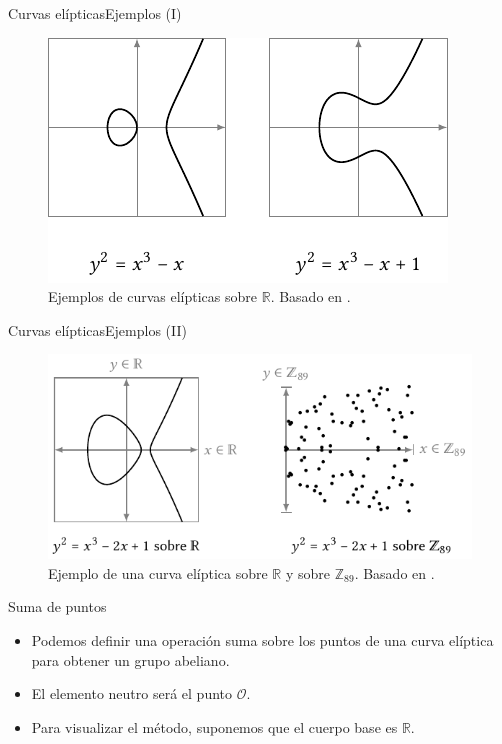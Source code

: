 \documentclass[spanish]{beamer}
\begin{document}
\begin{frame}[fragile]{Curvas elípticas}{Ejemplos (I)}
  \begin{figure}[h]
    \centering
    \includegraphics[width=.75\textwidth]{img/ejemplos-curvas}
    \caption{Ejemplos de curvas elípticas sobre $\mathbb{R}$. Basado en \parencite{eichlseder_elliptic_2016}.}
    \label{fig:curvas}
  \end{figure}
\end{frame}

\begin{frame}[fragile]{Curvas elípticas}{Ejemplos (II)}
  \begin{figure}[h]
    \centering
    \includegraphics[width=.85\textwidth]{img/cuerpos-curvas}
    \caption{Ejemplo de una curva elíptica sobre $\mathbb{R}$ y sobre $\mathbb{Z}_{89}$. Basado en \parencite{eichlseder_elliptic_2016}.}
    \label{fig:curvas-finitos}
  \end{figure}
\end{frame}

\begin{frame}{Suma de puntos}
  \begin{itemize}
    \item Podemos definir una operación suma sobre los puntos de una curva elíptica para obtener un grupo abeliano.
    \item El elemento neutro será el punto \(\mathcal{O}\).
    \item Para visualizar el método, suponemos que el cuerpo base es $\mathbb{R}$.
  \end{itemize}
\end{frame}
\end{document}
